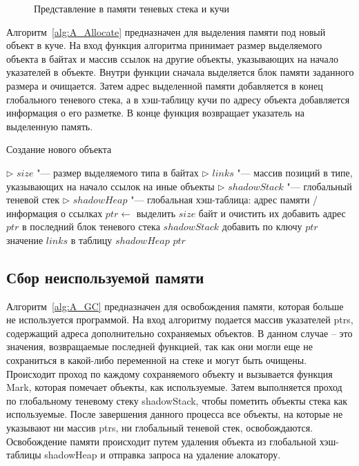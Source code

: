 \begin{figure}[h]
    \centering

    

    \caption{Представление в памяти теневых стека и кучи}
    \label{fig:heap-pres}
\end{figure}


Алгоритм~\ref{alg:A_Allocate} предназначен для выделения памяти под новый объект в куче.
На вход функция алгоритма принимает размер выделяемого объекта в байтах и массив ссылок на другие объекты, указывающих на начало указателей в объекте.
Внутри функции сначала выделяется блок памяти заданного размера и очищается.
Затем адрес выделенной памяти добавляется в конец глобального теневого стека, а в хэш-таблицу кучи по адресу объекта добавляется информация о его разметке.
В конце функция возвращает указатель на выделенную память.

\begin{breakablealgorithm}
    \caption{Создание нового объекта}
    \label{alg:A_Allocate}

    \begin{algorithmic}[1]
            \Statex $\triangleright$ $size$ "--- размер выделяемого типа в байтах
            \Statex $\triangleright$ $links$ "--- массив позиций в типе, указывающих на начало ссылок на иные объекты
            \Statex $\triangleright$ $shadowStack$ "--- глобальный теневой стек
            \Statex $\triangleright$ $shadowHeap$ "--- глобальная хэш-таблица: адрес памяти / информация о ссылках
            \Statex
            \State $ptr \leftarrow$ выделить $size$ байт и очистить их
            \State добавить адрес $ptr$ в последний блок теневого стека $shadowStack$
            \State добавить по ключу $ptr$ значение $links$ в таблицу $shadowHeap$
            \State \Return $ptr$
        \EndFunction
    \end{algorithmic}
\end{breakablealgorithm}

\subsection*{Сбор неиспользуемой памяти}


Алгоритм~\ref{alg:A_GC} предназначен для освобождения памяти, которая больше не используется программой.
На вход алгоритму подается массив указателей ptrs, содержащий адреса дополнительно сохраняемых объектов.
В данном случае -- это значения, возвращаемые последней функцией, так как они могли еще не сохраниться в какой-либо переменной на стеке и могут быть очищены.
Происходит проход по каждому сохраняемого объекту и вызывается функция Mark, которая помечает объекты, как используемые.
Затем выполняется проход по глобальному теневому стеку shadowStack, чтобы пометить объекты стека как используемые.
После завершения данного процесса все объекты, на которые не указывают ни массив ptrs, ни глобальный теневой стек, освобождаются.
Освобождение памяти происходит путем удаления объекта из глобальной хэш-таблицы shadowHeap и отправка запроса на удаление алокатору.

